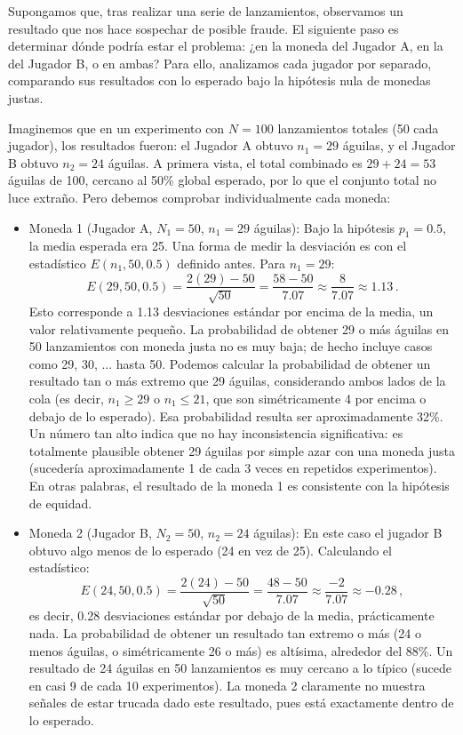 \documentclass[11pt,letterpaper]{article}
\begin{document}
Supongamos que, tras realizar una serie de lanzamientos, observamos un resultado que nos hace sospechar de posible fraude. El siguiente paso es determinar dónde podría estar el problema: ¿en la moneda del Jugador A, en la del Jugador B, o en ambas? Para ello, analizamos cada jugador por separado, comparando sus resultados con lo esperado bajo la hipótesis nula de monedas justas.

Imaginemos que en un experimento con $N=100$ lanzamientos totales (50 cada jugador), los resultados fueron: el Jugador A obtuvo $n_1 = 29$ águilas, y el Jugador B obtuvo $n_2 = 24$ águilas. A primera vista, el total combinado es $29+24 = 53$ águilas de 100, cercano al 50\% global esperado, por lo que el conjunto total no luce extraño. Pero debemos comprobar individualmente cada moneda:

\begin{itemize}



    \item  Moneda 1 (Jugador A, $N_1=50$, $n_1=29$ águilas): Bajo la hipótesis $p_1=0.5$, la media esperada era 25. Una forma de medir la desviación es con el estadístico $E(n_1,50,0.5)$ definido antes. Para $n_1=29$:
\[
E(29, 50, 0.5) = \frac{2(29) - 50}{\sqrt{50}} = \frac{58 - 50}{7.07} \approx \frac{8}{7.07} \approx 1.13\,.
\]
Esto corresponde a 1.13 desviaciones estándar por encima de la media, un valor relativamente pequeño. La probabilidad de obtener 29 o más águilas en 50 lanzamientos con moneda justa no es muy baja; de hecho incluye casos como 29, 30, ... hasta 50. Podemos calcular la probabilidad de obtener un resultado tan o más extremo que 29 águilas, considerando ambos lados de la cola (es decir, $n_1 \ge 29$ o $n_1 \le 21$, que son simétricamente 4 por encima o debajo de lo esperado). Esa probabilidad resulta ser aproximadamente 32\%. Un número tan alto indica que no hay inconsistencia significativa: es totalmente plausible obtener 29 águilas por simple azar con una moneda justa (sucedería aproximadamente 1 de cada 3 veces en repetidos experimentos). En otras palabras, el resultado de la moneda 1 es consistente con la hipótesis de equidad.

\item Moneda 2 (Jugador B, $N_2=50$, $n_2=24$ águilas): En este caso el jugador B obtuvo algo menos de lo esperado (24 en vez de 25). Calculando el estadístico:
\[
E(24, 50, 0.5) = \frac{2(24) - 50}{\sqrt{50}} = \frac{48 - 50}{7.07} \approx \frac{-2}{7.07} \approx -0.28\,,
\]
es decir, 0.28 desviaciones estándar por debajo de la media, prácticamente nada. La probabilidad de obtener un resultado tan extremo o más (24 o menos águilas, o simétricamente 26 o más) es altísima, alrededor del 88\%. Un resultado de 24 águilas en 50 lanzamientos es muy cercano a lo típico (sucede en casi 9 de cada 10 experimentos). La moneda 2 claramente no muestra señales de estar trucada dado este resultado, pues está exactamente dentro de lo esperado.

\end{itemize}
\end{document}
